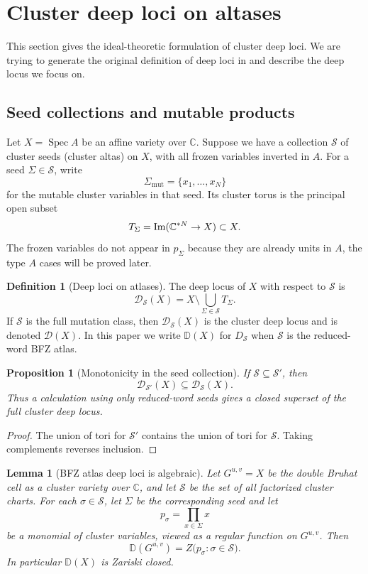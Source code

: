 \documentclass[12pt]{amsart}
\newcommand{\C}{\mathbb C}
\newcommand{\D}{\mathbb D}
\newcommand{\Spec}{\operatorname{Spec}}
\newcommand{\cS}{\mathcal S}
\newcommand{\cD}{\mathcal D}
\newcommand{\mut}{\operatorname{mut}}
\theoremstyle{plain}
\newtheorem{proposition}[theorem]{Proposition}
\newtheorem{lemma}[theorem]{Lemma}
\theoremstyle{definition}
\newtheorem{definition}[theorem]{Definition}
\theoremstyle{remark}
\begin{document}
\section{Cluster deep loci on altases}\label{sec:deep}

This section gives the ideal-theoretic formulation of cluster deep loci. We are trying to generate the original definition of deep loci in \cite{CGSS24} and describe the deep locus we focus on.

\subsection{Seed collections and mutable products}

Let $X=\Spec A$ be an affine variety over $\C$.  Suppose we have a collection $\cS$ of cluster seeds (cluster altas) on $X$, with all frozen variables inverted in $A$.  For a seed $\Sigma\in\cS$, write
\[
   \Sigma_{\mut}=\{x_1,\ldots,x_N\}
\]
for the mutable cluster variables in that seed.  Its cluster torus is the principal open subset
\[
   T_\Sigma=\textup{Im}(\C^{*N} \to X) \subset X.
\]
The frozen variables do not appear in $p_\Sigma$ because they are already units in $A$, the type $A$ cases will be proved later.

\begin{definition}[Deep loci on atlases]\label{def:seed_deep}
The deep locus of $X$ with respect to $\cS$ is
\[
   \cD_{\cS}(X)=X\setminus\bigcup_{\Sigma\in\cS}T_\Sigma.
\]
If $\cS$ is the full mutation class, then $\cD_{\cS}(X)$ is the cluster deep locus and is denoted $\cD(X)$.  In this paper we write $\D(X)$ for  $D_\cS$ when $\cS$ is the reduced-word BFZ atlas.
\end{definition}

\begin{proposition}[Monotonicity in the seed collection]\label{prop:monotonicity}
If $\cS\subseteq \cS'$, then
\[
   \cD_{\cS'}(X)\subseteq \cD_{\cS}(X).
\]
Thus a calculation using only reduced-word seeds gives a closed superset of the full cluster deep locus.
\end{proposition}

\begin{proof}
The union of tori for $\cS'$ contains the union of tori for $\cS$.  Taking complements reverses inclusion.
\end{proof}

\begin{lemma}[BFZ atlas deep loci is algebraic]\label{thm:intro_closed}
Let $G^{u,v}=X$ be the double Bruhat cell as a cluster variety over $\C$, and let $\cS$ be the set of all factorized cluster charts. For each $\sigma \in \cS$, let $\Sigma$ be the corresponding seed and let
\[
   p_\sigma=\prod_{x\in \Sigma}x
\]
be a monomial of cluster variables, viewed as a regular function on $G^{u,v}$.  Then
\[
   \D(G^{u,v})=Z\bigl(p_\sigma:\sigma\in\cS\bigr).
\]
In particular $\D(X)$ is Zariski closed.
\end{lemma}
\end{document}

